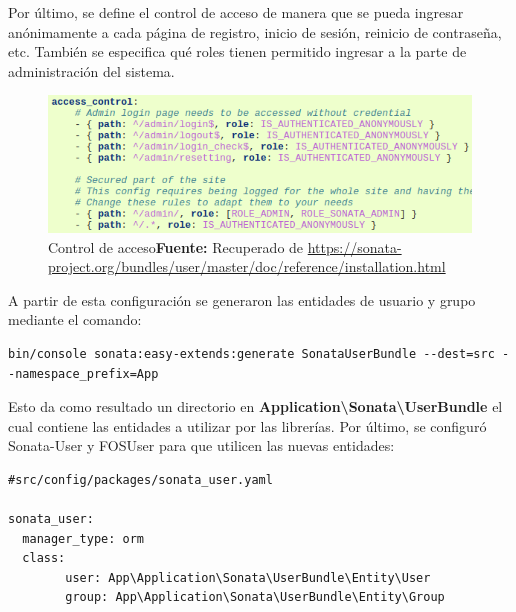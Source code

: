 \newpage
Por último, se define el control de acceso de manera que se pueda ingresar anónimamente a cada página de registro, inicio de sesión, reinicio de contraseña,
etc.
También se especifica qué roles tienen permitido ingresar a la parte de administración del sistema.

\begin{figure}[h]
    \includegraphics[width=1\linewidth]{image/acl.png}
    \caption{Control de acceso\newline \textbf{Fuente:} Recuperado de \url{https://sonata-project.org/bundles/user/master/doc/reference/installation.html}}
    \label{fig:image/acl}
\end{figure}


A partir de esta configuración se generaron las entidades de usuario y grupo mediante el comando:

\begin{lstlisting}
bin/console sonata:easy-extends:generate SonataUserBundle --dest=src --namespace_prefix=App
\end{lstlisting}


Esto da como resultado un directorio en \textbf{Application\textbackslash Sonata\textbackslash UserBundle} el cual contiene las entidades a utilizar por las librerías.
Por último, se configuró Sonata-User y FOSUser para que utilicen las nuevas entidades:

\begin{lstlisting}[caption={Archivo de configuración de Sonata-User.\\Fuente: \sonatainstallation}]
#src/config/packages/sonata_user.yaml

sonata_user:
  manager_type: orm
  class:
        user: App\Application\Sonata\UserBundle\Entity\User
        group: App\Application\Sonata\UserBundle\Entity\Group

\end{lstlisting}

